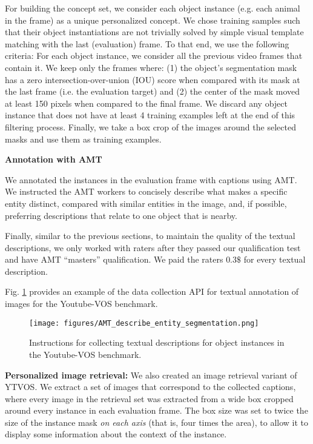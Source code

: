 \documentclass[runningheads]{llncs}
\newcommand{\figref}[1]{Fig. \ref{#1}}
\begin{document}
For building the concept set, we consider each object instance (e.g. each animal in the frame) as a unique personalized concept. We chose training samples such that their object instantiations are not trivially solved by simple visual template matching with the last (evaluation) frame. To that end, we use the following criteria:  For each object instance, we consider all the previous video frames that contain it. We keep only the frames where: (1) the object's segmentation mask has a zero intersection-over-union (IOU) score when compared with its mask at the last frame (i.e. the evaluation target) and (2) the center of the mask moved at least 150 pixels when compared to the final frame. We discard any object instance that does not have at least 4 training examples left at the end of this filtering process. Finally, we take a box crop of the images around the selected masks and use them as training examples.



\vspace{5pt}\noindent\textbf{Annotation with AMT}

We annotated the instances in the evaluation frame with captions using AMT. We instructed the AMT workers to concisely describe what makes a specific entity distinct, compared with similar entities in the image, and, if possible, preferring descriptions that relate to one object that is nearby. 

Finally, similar to the previous sections, to maintain the quality of the textual descriptions, we only worked with raters after they passed our qualification test and have AMT ``masters'' qualification.
We paid the raters $0.3\$$ for every textual description.

\figref{fig_AMT_describe_entity_segmentation} provides an example of the data collection API for textual annotation of images for the Youtube-VOS benchmark.


\begin{figure}[h]
    \centering
    \texttt{[image: figures/AMT\_describe\_entity\_segmentation.png]} \hspace{-10pt}
    \vspace{-10pt}
    \caption{
Instructions for collecting textual descriptions for object instances in the Youtube-VOS benchmark.
    }
    \label{fig_AMT_describe_entity_segmentation}
    \vspace{-5pt}
\end{figure}


\vspace{5pt}\noindent\textbf{Personalized image retrieval:}
We also created an image retrieval variant of YTVOS. We extract a set of images that correspond to the collected captions, where every image in the retrieval set was extracted from a wide box cropped around every instance in each evaluation frame. The box size was set to twice the size of the instance mask \textit{on each axis} (that is, four times the area), to allow it to display some information about the context of the instance.



\clearpage{}
\end{document}
